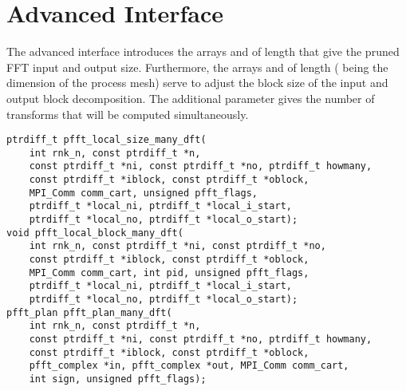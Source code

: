 \section{Advanced Interface}
The advanced interface introduces the arrays  and  of length 
that give the pruned FFT input and output size.
Furthermore, the arrays  and  of length  ( being the dimension of the process mesh)
serve to adjust the block size of the input and output block decomposition.
The additional parameter  gives the number of transforms that will be computed simultaneously.
\begin{lstlisting}
ptrdiff_t pfft_local_size_many_dft(
    int rnk_n, const ptrdiff_t *n,
    const ptrdiff_t *ni, const ptrdiff_t *no, ptrdiff_t howmany,
    const ptrdiff_t *iblock, const ptrdiff_t *oblock,
    MPI_Comm comm_cart, unsigned pfft_flags,
    ptrdiff_t *local_ni, ptrdiff_t *local_i_start,
    ptrdiff_t *local_no, ptrdiff_t *local_o_start);
void pfft_local_block_many_dft(
    int rnk_n, const ptrdiff_t *ni, const ptrdiff_t *no,
    const ptrdiff_t *iblock, const ptrdiff_t *oblock,
    MPI_Comm comm_cart, int pid, unsigned pfft_flags,
    ptrdiff_t *local_ni, ptrdiff_t *local_i_start,
    ptrdiff_t *local_no, ptrdiff_t *local_o_start);
pfft_plan pfft_plan_many_dft(
    int rnk_n, const ptrdiff_t *n,
    const ptrdiff_t *ni, const ptrdiff_t *no, ptrdiff_t howmany,
    const ptrdiff_t *iblock, const ptrdiff_t *oblock,
    pfft_complex *in, pfft_complex *out, MPI_Comm comm_cart,
    int sign, unsigned pfft_flags);
\end{lstlisting}


